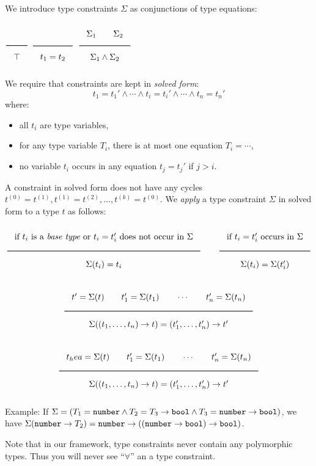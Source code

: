 We introduce type constraints $\Sigma$ as conjunctions of type equations:

$\Rule{}{\top}$
\hfill 
$\Rule{}{t_1 = t_2}$
\hfill 
$\Rule{\Sigma_1 \qquad \Sigma_2}{\Sigma_1 \wedge \Sigma_2}$

\noindent
We require that constraints are kept in \emph{solved form}:
\[
t_1 = t_1' \wedge \cdots \wedge t_i = t_i' \wedge \cdots \wedge t_n = t_n'
\]
where:
\begin{itemize}
\item all $t_i$ are type variables,
\item for any type variable $T_i$, there is at most one equation $T_i = \cdots$,
\item no variable $t_i$ occurs in any equation $t_j = t_j'$ if $j > i$.
\end{itemize}
A constraint in solved form does not have any cycles $t^{(0)} = t^{(1)}, t^{(1)} = t^{(2)}, \ldots, t^{(k)} = t^{(0)}$.
We \emph{apply} a type constraint $\Sigma$ in solved form to a type $t$ as follows:

\[
  \Rule{\textrm{if $t_i$ is a \emph{base type} or }t_i = t_i'\textrm{ does not occur in }\Sigma}{
    \Sigma(t_i) = t_i}
  \qquad
  \Rule{\textrm{if }t_i = t_i'\textrm{ occurs in }\Sigma}{
    \Sigma(t_i) = \Sigma(t_i')}  
\]

\[
  \Rule{t' = \Sigma(t) \qquad t_1' = \Sigma(t_1) \qquad \cdots \qquad t_n' = \Sigma(t_n) }{
  \Sigma((t_1, \ldots, t_n) \rightarrow t) = (t_1', \ldots, t_n') \rightarrow t'}
\]

\[
  \Rule{t_hea = \Sigma(t) \qquad t_1' = \Sigma(t_1) \qquad \cdots \qquad t_n' = \Sigma(t_n) }{
  \Sigma((t_1, \ldots, t_n) \rightarrow t) = (t_1', \ldots, t_n') \rightarrow t'}
\]

\noindent
Example: If $\Sigma = (T_1 = \texttt{number} \wedge T_2 = T_3 \rightarrow \texttt{bool} \wedge T_3 = \texttt{number}
\rightarrow \texttt{bool})$, we have $\Sigma(\texttt{number} \rightarrow T_2) = \texttt{number} \rightarrow ((\texttt{number}
\rightarrow \texttt{bool}) \rightarrow \texttt{bool})$.

Note that in our framework, type constraints never contain any polymorphic types. Thus
you will never see ``$\forall$'' an a type constraint.

